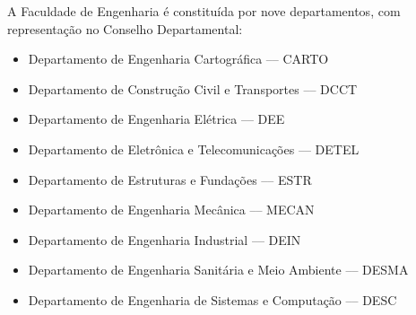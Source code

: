 A Faculdade de Engenharia é constituída por nove departamentos, com representação no Conselho Departamental:

\begin{itemize}
	\item Departamento de Engenharia Cartográfica –-- CARTO
	\item Departamento de Construção Civil e Transportes –-- DCCT
	\item Departamento de Engenharia Elétrica –-- DEE
	\item Departamento de Eletrônica e Telecomunicações –-- DETEL
	\item Departamento de Estruturas e Fundações –-- ESTR
	\item Departamento de Engenharia Mecânica –-- MECAN
	\item Departamento de Engenharia Industrial –-- DEIN
	\item Departamento de Engenharia Sanitária e Meio Ambiente –-- DESMA
	\item Departamento de Engenharia de Sistemas e Computação –-- DESC
\end{itemize}

